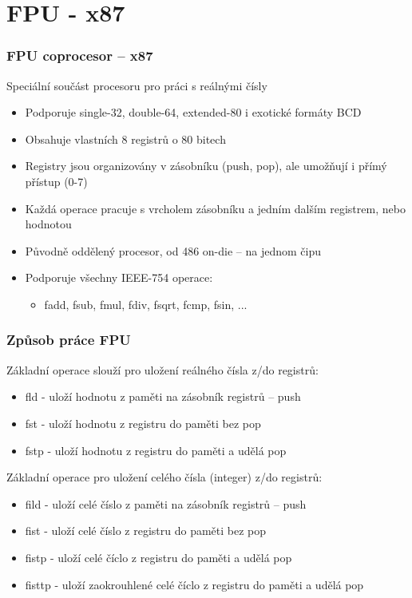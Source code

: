 \documentclass{beamer}
\begin{document}
\section{FPU - x87}


\begin{frame}
\frametitle{FPU coprocesor – x87}
Speciální součást procesoru pro práci s reálnými čísly
\begin{itemize}
\item Podporuje single-32, double-64, extended-80 i exotické formáty BCD
\item Obsahuje vlastních 8 registrů o 80 bitech
\item Registry jsou organizovány v zásobníku (push, pop), ale umožňují i přímý přístup (0-7)
\item Každá operace pracuje s vrcholem zásobníku a jedním dalším registrem, nebo hodnotou
\item Původně oddělený procesor, od 486 on-die -- na jednom čipu
\item Podporuje všechny IEEE-754 operace:
\begin{itemize}
\item fadd, fsub, fmul, fdiv, fsqrt, fcmp, fsin, ...
\end{itemize}
\end{itemize}
\end{frame}

\begin{frame}
\frametitle{Způsob práce FPU}
Základní operace slouží pro uložení reálného čísla z/do registrů:
\begin{itemize}
\item fld - uloží hodnotu z paměti na zásobník registrů -- push
\item fst - uloží hodnotu z registru do paměti bez pop
\item fstp - uloží hodnotu z registru do paměti a udělá pop
\end{itemize}
Základní operace pro uložení celého čísla (integer) z/do registrů:
\begin{itemize}
\item fild - uloží celé číslo z paměti na zásobník registrů -- push
\item fist - uloží celé číslo z registru do paměti bez pop
\item fistp - uloží celé číclo z registru do paměti a udělá pop
\item fisttp - uloží zaokrouhlené celé číclo z registru do paměti a udělá pop
\end{itemize}
\end{frame}
\end{document}
